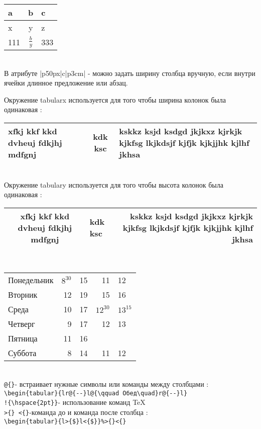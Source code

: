 \documentclass[a4paper,12pt]{article}%
\theoremstyle{plain}%
\theoremstyle{definition}%
\theoremstyle{remark}%
\begin{document}
\begin{tabular}{|p{50px}|c|p{3cm}|}
 \hline a & b & c \\
 \hline x & y & z \\
 \hline 111 & $\displaystyle\frac{b}{y}$ & 333 \\[4mm]
 \hline
\end{tabular} \\

\noindent В атрибуте {|p{50px}|c|p{3cm}|} - можно задать ширину столбца вручную, если внутри ячейки длинное предложение или абзац.

Окружение tabularx используется для того чтобы ширина колонок была одинаковая : \\

\begin{tabularx}{\textwidth}{|X|c|X|}%
 \hline xfkj kkf kkd dvheuj fdkjhj mdfgnj & kdk ksc & kskkz ksjd ksdgd jkjkxz kjrkjk kjkfsg lkjkdsjf kjfjk kjkjjhk kjlhf jkhsa\\
 \hline
\end{tabularx} \\

Окружение tabulary используется для того чтобы высота колонок была одинаковая : \\

\begin{tabulary}{\textwidth}{|C|J|R|}%
 \hline xfkj kkf kkd dvheuj fdkjhj mdfgnj & kdk ksc & kskkz ksjd ksdgd jkjkxz kjrkjk kjkfsg lkjkdsjf kjfjk kjkjjhk kjlhf jkhsa \\
 \hline
\end{tabulary} \\

\begin{tabular}{lr@{--}l@{\qquad Обед\quad}r@{--}l}
Понедельник & $8^{30}$ & 15 & 11 & 12 \\ 
Вторник& 12 & 19 & 15 & 16 \\ 
Среда& 10 & 17 & $12^{30}$ & $13^{15}$ \\ 
Четверг& 9 & 17 & 12 & 13 \\ 
Пятница& 11 & 16 & &\\ 
Суббота& 8 & 14 & 11 & 12\\ 
\end{tabular} \\

\noindent \verb|@{}|- встраивает нужные символы или команды между столбцами : \\
\verb|\begin{tabular}{lr@{--}l@{\qquad Обед\quad}r@{--}l}| \\
\verb|!{\hspace{2pt}}|- использование команд TeX \\
\verb|>{} <{}|-команда до и команда после столбца : \\
\verb|\begin{tabular}{l>{$}l<{$}}%>{}<{}| \\
\end{document}
